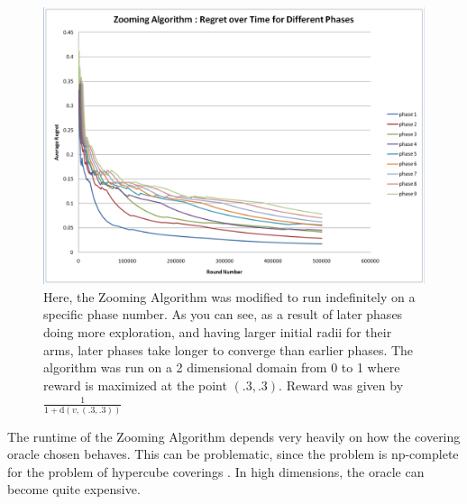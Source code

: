 \begin{figure}[!ht]
  \begin{center}
    \includegraphics[width=5 in]{figures/Phase_Comparison.png}
     \caption{Here, the Zooming Algorithm was modified to run
       indefinitely on a specific phase number. As you can see, as a
       result of later phases doing more exploration, and having
       larger initial radii for their arms, later phases take longer
       to converge than earlier phases. The algorithm was run on a 2
       dimensional domain from 0 to 1 where reward is maximized at the
       point $(.3,.3)$. Reward was given by
       $\frac{1}{1+\mathrm{d}(v,(.3,.3))}$}
     \label{fig:zoomphase}
  \end{center}
\end{figure}



The runtime of the Zooming Algorithm depends very heavily on how the
covering oracle chosen behaves. This can be problematic, since the problem
is np-complete for the problem of hypercube coverings  \cite{Hoffmann05acovering} . In high dimensions,
the oracle can become quite expensive.

